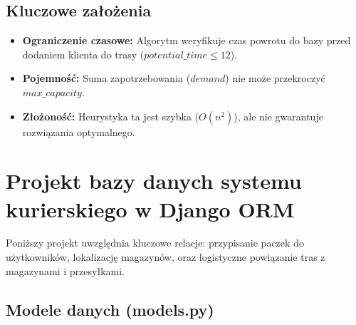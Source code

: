 \subsection*{Kluczowe założenia}
\begin{itemize}
    \item \textbf{Ograniczenie czasowe:} Algorytm weryfikuje czas powrotu do bazy przed dodaniem klienta do trasy ($potential\_time \le 12$).
    \item \textbf{Pojemność:} Suma zapotrzebowania ($demand$) nie może przekroczyć $max\_capacity$.
    \item \textbf{Złożoność:} Heurystyka ta jest szybka ($O(n^2)$), ale nie gwarantuje rozwiązania optymalnego.
\end{itemize}

\section{Projekt bazy danych systemu kurierskiego w Django ORM}

Poniższy projekt uwzględnia kluczowe relacje: przypisanie paczek do użytkowników, lokalizację magazynów, oraz logistyczne powiązanie tras z magazynami i przesyłkami.

\subsection*{Modele danych (models.py)}

